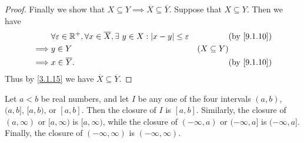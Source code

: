 \begin{proof}
  Finally we show that \(X \subseteq Y \implies \overline{X} \subseteq \overline{Y}\).
  Suppose that \(X \subseteq Y\).
  Then we have
  \begin{align*}
             & \forall \varepsilon \in \R^+, \forall x \in \overline{X}, \exists\ y \in X : \abs{x - y} \leq \varepsilon &                 & \text{(by \cref{9.1.10})} \\
    \implies & y \in Y                                                                                                   & (X \subseteq Y)                             \\
    \implies & x \in \overline{Y}.                                                                                       &                 & \text{(by \cref{9.1.10})}
  \end{align*}
  Thus by \cref{3.1.15} we have \(\overline{X} \subseteq \overline{Y}\).
\end{proof}

\begin{lem}\label{9.1.12}
  Let \(a < b\) be real numbers, and let \(I\) be any one of the four intervals \((a, b)\), \((a, b]\), \([a, b)\), or \([a, b]\).
  Then the closure of \(I\) is \([a, b]\).
  Similarly, the closure of \((a, \infty)\) or \([a, \infty)\) is \([a, \infty)\), while the closure of \((-\infty, a)\) or \((-\infty, a]\) is \((-\infty, a]\).
  Finally, the closure of \((-\infty, \infty)\) is \((-\infty, \infty)\).
\end{lem}

